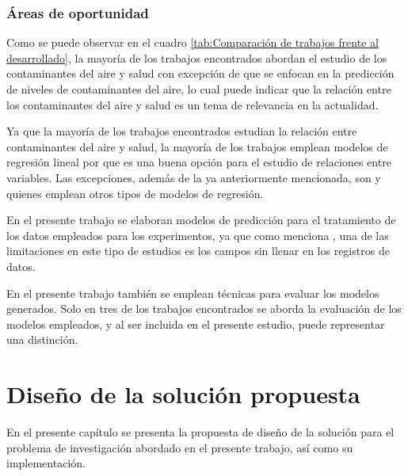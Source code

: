 \subsection{Áreas de oportunidad}
Como se puede observar en el cuadro \ref{tab:Comparación de trabajos frente al desarrollado}, la mayoría de los trabajos encontrados abordan el estudio de los contaminantes del aire y salud con excepción de \citet{r13} que se enfocan en la predicción de niveles de contaminantes del aire, lo cual puede indicar que la relación entre los contaminantes del aire y salud es un tema de relevancia en la actualidad. 

Ya que la mayoría de los trabajos encontrados estudian la relación entre contaminantes del aire y salud, la mayoría de los trabajos emplean modelos de regresión lineal por que es una buena opción para el estudio de relaciones entre variables. Las excepciones, además de la ya anteriormente mencionada, son \citet{r17} y \citet{r18} quienes emplean otros tipos de modelos de regresión.

En el presente trabajo se elaboran modelos de predicción para el tratamiento de los datos empleados para los experimentos, ya que como menciona \citet{r15}, una de las limitaciones en este tipo de estudios es los campos sin llenar en los registros de datos.

En el presente trabajo también se emplean técnicas para evaluar los modelos generados. Solo en tres de los trabajos encontrados se aborda la evaluación de los modelos empleados, y al ser incluida en el presente estudio, puede representar una distinción.

\chapter{Diseño de la solución propuesta}
En el presente capítulo se presenta la propuesta de diseño de la solución para el problema de investigación abordado en el presente trabajo, así como su implementación.

